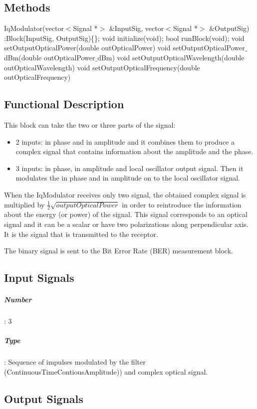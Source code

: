 \subsection*{Methods}

IqModulator(vector$<$Signal *$>$ \&InputSig, vector$<$Signal *$>$ \&OutputSig) :Block(InputSig, OutputSig)\{\};
\bigbreak
void initialize(void);
\bigbreak
bool runBlock(void);
\bigbreak
void setOutputOpticalPower(double outOpticalPower)
\bigbreak
void setOutputOpticalPower$\_$dBm(double outOpticalPower$\_$dBm)
\bigbreak
void setOutputOpticalWavelength(double outOpticalWavelength)
\bigbreak
void setOutputOpticalFrequency(double outOpticalFrequency)

\subsection*{Functional Description}

This block can take the two or three parts of the signal: 
\begin{itemize}
    \item   2 inputs: in phase and in amplitude and it combines them to produce a complex signal that contains information about the amplitude and the phase.
    \item   3 inputs: in phase, in amplitude and local oscillator output signal. Then it modulates the in phase and in amplitude on to the local oscillator signal.
\end{itemize}
When the IqModulator receives only two signal, the obtained complex signal is multiplied by $\frac{1}{2}\sqrt{\textit{outputOpticalPower}}$ in order to reintroduce the information about the energy (or power) of the signal. This signal corresponds to an optical signal and it can be a scalar or have two polarizations along perpendicular axis. It is the signal that is transmitted to the receptor.

The binary signal is sent to the Bit Error Rate (BER) measurement block.

\subsection*{Input Signals}

\subparagraph*{Number}: 3

\subparagraph*{Type}: Sequence of impulses modulated by the filter (ContinuousTimeContiousAmplitude)) and complex optical signal.

\subsection*{Output Signals}

